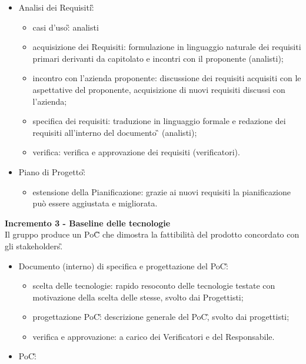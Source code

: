 {{    \begin{itemize}
        \item Analisi dei Requisiti\G:
            \begin{itemize}
                \item casi d'uso\G: analisti
                \item acquisizione dei Requisiti: formulazione in linguaggio naturale dei requisiti primari derivanti da capitolato e incontri con il proponente (analisti);
                \item incontro con l'azienda proponente: discussione dei requisiti acquisiti con le aspettative del proponente, acquisizione di nuovi requisiti discussi con l'azienda;
                \item specifica dei requisiti: traduzione in linguaggio formale e redazione dei requisiti all'interno del documento \AdR\G{} (analisti);
                \item verifica: verifica e approvazione dei requisiti (verificatori).
            \end{itemize}
    \item Piano di Progetto\G: 
        \begin{itemize}
            \item estensione della Pianificazione: grazie ai nuovi requisiti la pianificazione può essere aggiustata e migliorata.
        \end{itemize} 
    \end{itemize}
    \textbf{Incremento 3 - Baseline delle tecnologie} \\
    Il gruppo produce un PoC\G{} che dimostra la fattibilità del prodotto concordato con gli stakeholders\G. \\
    \begin{itemize}
        \item Documento (interno) di specifica e progettazione del PoC\G:
            \begin{itemize}
                \item scelta delle tecnologie: rapido resoconto delle tecnologie testate con motivazione della scelta delle stesse, svolto dai Progettisti;
                \item progettazione PoC\G: descrizione generale del PoC\G, svolto dai progettisti;
                \item verifica e approvazione: a carico dei Verificatori e del Responsabile.
            \end{itemize}
        \item PoC\G: 

\end{itemize}}}

